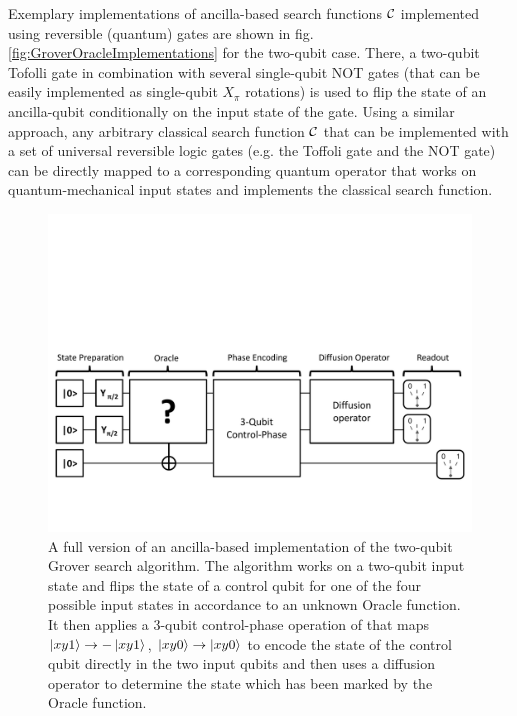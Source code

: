 Exemplary implementations of ancilla-based search functions $\Or$ implemented using reversible (quantum) gates are shown in fig. \ref{fig:GroverOracleImplementations} for the two-qubit case. There, a two-qubit Tofolli gate in combination with several single-qubit NOT gates (that can be easily implemented as single-qubit $X_{\pi}$ rotations) is used to flip the state of an ancilla-qubit conditionally on the input state of the gate. Using a similar approach, any arbitrary classical search function $\Or$ that can be implemented with a set of universal reversible logic gates (e.g. the Toffoli gate and the NOT gate) can be directly mapped to a corresponding quantum operator that works on quantum-mechanical input states and implements the classical search function.

\begin{figure}[ht!]
	\centering
		\includegraphics[width=1\textwidth]{./material/papers/grover/quantum_algorithm_full}
	\caption[Full version of an ancilla-based implementation of the two-qubit Grover search algorithm]{A full version of an ancilla-based implementation of the two-qubit Grover search algorithm. The algorithm works on a two-qubit input state and flips the state of a control qubit for one of the four possible input states in accordance to an unknown Oracle function. It then applies a 3-qubit control-phase operation of that maps $\left| xy1 \right>\to -\left| xy1 \right>$, $\left| xy0 \right>\to\left| xy0 \right>$ to encode the state of the control qubit directly in the two input qubits and then uses a diffusion operator to determine the state which has been marked by the Oracle function.}
	\label{fig:GroverAlgorithmFullSchematic}
\end{figure}

